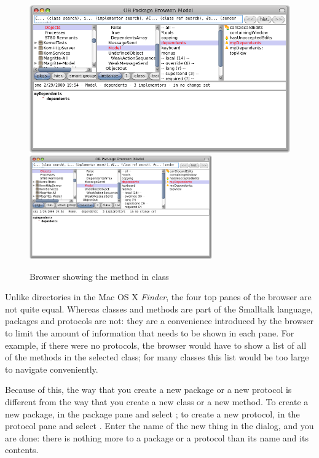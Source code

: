 \documentclass[a4paper,10pt,twoside]{book}
\begin{document}
\begin{figure}[htbp]
   \centering
   \ifluluelse
	   {\includegraphics[width=\textwidth]{SystemBrowserMyDependents}}
	   {\includegraphics[width=0.7\textwidth]{SystemBrowserMyDependents}}
   \caption{Browser showing the  method in class 
   }
\end{figure}

Unlike directories in the Mac OS X \emph{Finder}, the four top panes of the browser are not quite equal.  
Whereas classes and methods are part of the Smalltalk language, packages and protocols are not: they are a convenience introduced by the browser to limit the amount of information that needs to be shown in each pane.  For example, if there were no protocols, the browser would have to show a list of all of the methods in the selected class; for many classes this list would be too large to navigate conveniently.  

Because of this, the way that you create a new package or a new protocol is different from the way that you create a new class or a new method.  To create a new package, \actclick in the package pane and select ; to create a new protocol, \actclick in the protocol pane and select .
Enter the name of the new thing in the dialog, and you are done: there is nothing more to a package or a protocol than its name and its contents.
\end{document}
